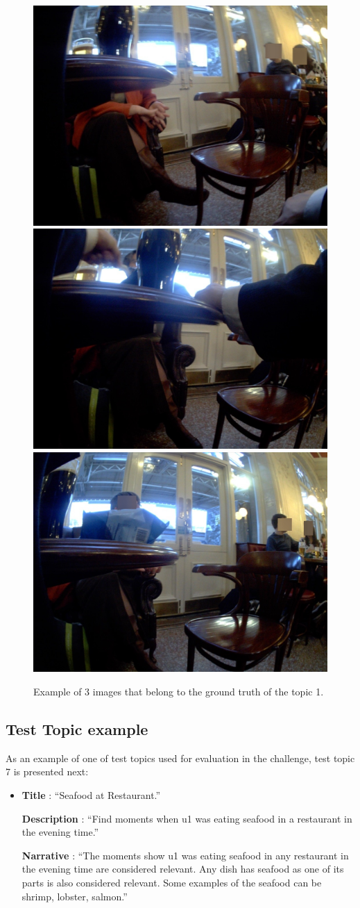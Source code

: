     \begin{figure}[H]
        \centering
        \captionsetup{justification=centering}
        \includegraphics[width=.3\linewidth]{Sections/5ImageClef/images/example.jpg}
        \includegraphics[width=.3\linewidth]{Sections/5ImageClef/images/example1.jpg}
        \includegraphics[width=.3\linewidth]{Sections/5ImageClef/images/example3.jpg}
        \caption[Ground truth images]{Example of 3 images that belong to the ground truth of the topic 1.}
        \label{fig:gt_images}
    \end{figure}      

    \newpage


    \subsection{Test Topic example}

    As an example of one of test topics used for evaluation in the challenge, test topic 7 is presented next:

        \begin{itemize}

        \item []
        

        \textbf{Title} : \enquote{Seafood at Restaurant.}

        \textbf{Description} : \enquote{Find moments when u1 was eating seafood in a restaurant in the evening time.}

        \textbf{Narrative} : \enquote{The moments show u1 was eating seafood in any restaurant in the evening time are considered relevant. Any dish has seafood as one of its parts is also considered relevant. Some examples of the seafood can be shrimp, lobster, salmon.}

        \end{itemize}
     
